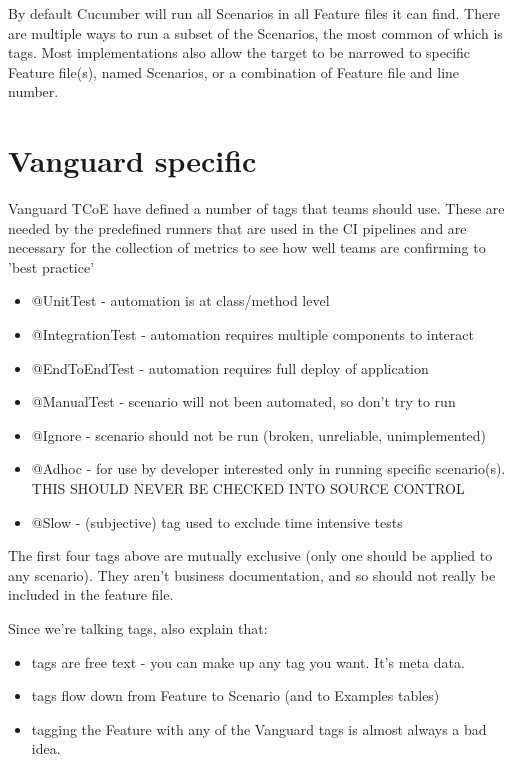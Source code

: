     By default Cucumber will run all Scenarios in all Feature files it can find. There are multiple ways to run a subset of the Scenarios, the most common of which is tags. Most implementations also allow the target to be narrowed to specific Feature file(s), named Scenarios, or a combination of Feature file and line number.
    
   \section*{Vanguard specific}
   
   Vanguard TCoE have defined a number of tags that teams should use. These are needed by the predefined runners that are used in the CI pipelines and are necessary for the collection of metrics to see how well teams are confirming to 'best practice'
   
   \begin{itemize}
       \item @UnitTest - automation is at class/method level
       \item @IntegrationTest - automation requires multiple components to interact
       \item @EndToEndTest - automation requires full deploy of application
       \item @ManualTest - scenario will not been automated, so don't try to run
       \item @Ignore - scenario should not be run (broken, unreliable, unimplemented)
       \item @Adhoc - for use by developer interested only in running specific scenario(s). THIS SHOULD NEVER BE CHECKED INTO SOURCE CONTROL
       \item @Slow - (subjective) tag used to exclude time intensive tests
   \end{itemize}
   
   The first four tags above are mutually exclusive (only one should be applied to any scenario). They aren't business documentation, and so should not really be included in the feature file.
   
   Since we're talking tags, also explain that:
   \begin{itemize}
       \item tags are free text - you can make up any tag you want. It's meta data.
       \item tags flow down from Feature to Scenario (and to Examples tables)
       \item tagging the Feature with any of the Vanguard tags is almost always a bad idea.
   \end{itemize}

